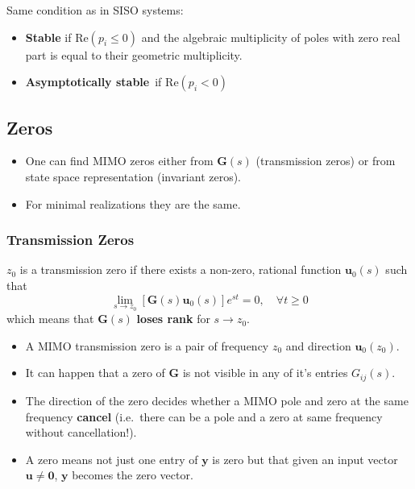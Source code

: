 
\newpar{}

Same condition as in SISO systems:
\begin{itemize}
    \item \textbf{Stable} if $\mathrm{Re}(p_i \le 0)$ and the algebraic multiplicity of poles with zero real part is equal to their geometric multiplicity.
    \item \textbf{Asymptotically stable}\ if $\mathrm{Re}(p_i<0)$
\end{itemize}


\subsection{Zeros}
\begin{itemize}
    \item One can find MIMO zeros either from $\mathbf{G}(s)$ (transmission zeros) or from state space representation (invariant zeros).
    \item For minimal realizations they are the same.
\end{itemize}

\subsubsection{Transmission Zeros}

$z_0$ is a transmission zero if there exists a non-zero, rational function $\mathbf{u}_0(s)$ such that
\begin{equation*}
    \lim_{s\to z_0}\left[\mathbf{G}(s)\mathbf{u}_0(s)\right]e^{st}=0,\quad\forall t\geq0
\end{equation*}
which means that $\mathbf{\mathbf{G}}(s)$ \textbf{loses rank} for $s\to z_0$.


\begin{itemize}
    \item A MIMO transmission zero is a pair of frequency $z_0$ and direction $\mathbf{u}_0(z_0)$.
    \item It can happen that a zero of $\mathbf{G}$ is not visible in any of it's entries $G_{ij}(s)$.
    \item The direction of the zero decides whether a MIMO pole and zero at the same frequency \textbf{cancel} (i.e.\ there can be a pole and a zero at same frequency without cancellation!).
    \item A zero means not just one entry of $\mathbf{y}$ is zero but that given an input vector $\mathbf{u} \ne \mathbf{0}$, $\mathbf{y}$ becomes the zero vector.
\end{itemize}

